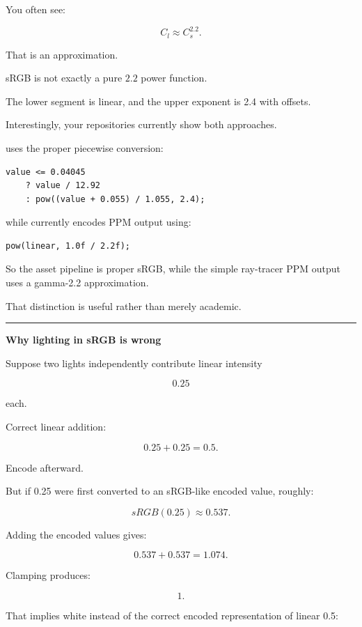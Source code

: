 You often see:

\[
C_l\approx C_s^{2.2}.
\]

That is an approximation.

sRGB is not exactly a pure \(2.2\) power function.

The lower segment is linear, and the upper exponent is 2.4 with offsets.

Interestingly, your repositories currently show both approaches.

 uses the proper piecewise conversion:

\begin{verbatim}
value <= 0.04045
    ? value / 12.92
    : pow((value + 0.055) / 1.055, 2.4);
\end{verbatim}

while  currently encodes PPM output using:

\begin{verbatim}
pow(linear, 1.0f / 2.2f);
\end{verbatim}

So the asset pipeline is proper sRGB, while the simple ray-tracer PPM output uses a gamma-2.2 approximation.

That distinction is useful rather than merely academic.

\begin{center}\rule{0.5\linewidth}{0.5pt}\end{center}

\textbf{Why lighting in sRGB is wrong}

Suppose two lights independently contribute linear intensity

\[
0.25
\]

each.

Correct linear addition:

\[
0.25+0.25=0.5.
\]

Encode afterward.

But if 0.25 were first converted to an sRGB-like encoded value, roughly:

\[
sRGB(0.25)\approx0.537.
\]

Adding the encoded values gives:

\[
0.537+0.537=1.074.
\]

Clamping produces:

\[
1.
\]

That implies white instead of the correct encoded representation of linear 0.5:

